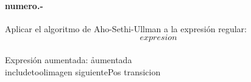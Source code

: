
\paragraph{{numero}.-}\label{p{numero}}
Aplicar el algoritmo de Aho-Sethi-Ullman a la expresión regular:
\[
    {expresion}
\]
~\\
Expresión aumentada: \h{{aumentada}} \\

{includetool}{{imagen}}
{siguientePos}
\quad
{transicion}
